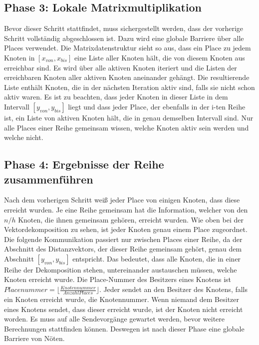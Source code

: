 \subsection{Phase 3: Lokale Matrixmultiplikation} %
\label{ssub:lokale_matrixmultiplikation}
Bevor dieser Schritt stattfindet, muss sichergestellt werden, dass der vorherige Schritt vollständig abgeschlossen ist. Dazu wird eine globale Barriere über alle Places verwendet. Die Matrixdatenstruktur sieht so aus, dass ein Place zu jedem Knoten in $\left[x_{von}, x_{bis} \right]$ eine Liste aller Knoten hält, die von diesem Knoten aus erreichbar sind. Es wird über alle aktiven Knoten iteriert und die Listen der erreichbaren Knoten aller aktiven Knoten aneinander gehängt. Die resultierende Liste enthält Knoten, die in der nächsten Iteration aktiv sind, falls sie nicht schon aktiv waren. Es ist zu beachten, dass jeder Knoten in dieser Liste in dem Intervall $\left[y_{von}, y_{bis} \right]$ liegt und dass jeder Place, der ebenfalls in der i-ten Reihe ist, ein Liste von aktiven Knoten hält, die in genau demselben Intervall sind. Nur alle Places einer Reihe gemeinsam wissen, welche Knoten aktiv sein werden und welche nicht.

\subsection{Phase 4: Ergebnisse der Reihe zusammenführen} %
\label{ssub:ergebnisse_der_reihe_zusammenf_hren}
Nach dem vorherigen Schritt weiß jeder Place von einigen Knoten, dass diese erreicht wurden. Je eine Reihe gemeinsam hat die Information, welcher von den $n/h$ Knoten, die ihnen gemeinsam gehören, erreicht wurden. Wie oben bei der Vektordekomposition zu sehen, ist jeder Knoten genau einem Place zugeordnet. Die folgende Kommunikation passiert nur zwischen Places einer Reihe, da der Abschnitt des Distanzvektors, der dieser Reihe gemeinsam gehört, genau dem Abschnitt $\left[y_{von}, y_{bis} \right]$ entspricht. Das bedeutet, dass alle Knoten, die in einer Reihe der Dekomposition stehen, untereinander austauschen müssen, welche Knoten erreicht wurde. Die Place-Nummer des Besitzers eines Knotens ist $\mathit{Placenummer}=\lfloor\frac{\mathit{Knotennummer}}{\mathit{Anzahl Places}}\rfloor$. Jeder sendet an den Besitzer des Knotens, falls ein Knoten erreicht wurde, die Knotennummer. Wenn niemand dem Besitzer eines Knotens sendet, dass dieser erreicht wurde, ist der Knoten nicht erreicht worden. Es muss auf alle Sendevorgänge gewartet werden, bevor weitere Berechnungen stattfinden können. Deswegen ist nach dieser Phase eine globale Barriere von Nöten.

